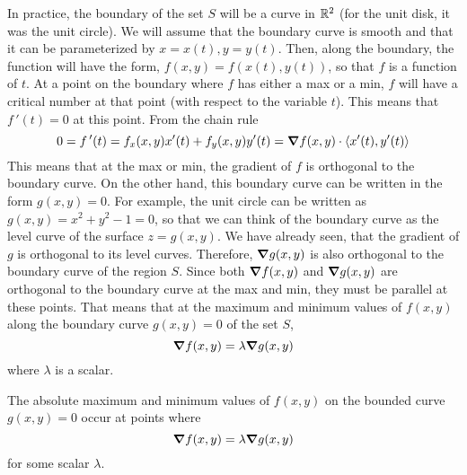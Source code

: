 \documentclass[handout]{ximera}
\begin{document}
In practice, the boundary of the set $S$ will be a curve in $\mathbb R^2$ (for the unit disk, it was the unit circle).
We will assume that the boundary curve is smooth and that it can be parameterized by $x = x(t), y = y(t)$.
Then, along the boundary, the function will have the form, $f(x, y) = f(x(t), y(t))$, so that $f$ is a function of $t$.
At a point on the boundary where $f$ has either a max or a min, $f$ will have a critical number at that point (with respect to the variable $t$).
This means that $f\,'(t) = 0$ at this point. From the chain rule
\[
0 = f\,'(t) = f_x(x, y) x'(t) + f_y(x,y) y'(t) = \boldsymbol\nabla f(x,y) \cdot \left\langle x'(t), y'(t)\right\rangle
\]
This means that at the max or min, the gradient of $f$ is orthogonal to the boundary curve.
On the other hand, this boundary curve can be written in the form $g(x,y) = 0$. For example, the unit circle can be written as $g(x,y) = x^2 + y^2 - 1 = 0$,
so that we can think of the boundary curve as the level curve of the surface $z = g(x,y)$. We have already seen, that the gradient of $g$ is orthogonal
to its level curves.  Therefore, $\boldsymbol\nabla g(x,y)$ is also orthogonal to the boundary curve of the region $S$.
Since both $\boldsymbol\nabla f(x,y)$ and $\boldsymbol\nabla g(x,y)$ are orthogonal to the boundary curve at the max and min, they must be parallel at these points.
That means that at the maximum and minimum values of $f(x,y)$ along the boundary curve $g(x,y) = 0$ of the set $S$, 
\[
\boldsymbol\nabla f(x,y) = \lambda \boldsymbol\nabla g(x,y)
\]
where $\lambda$ is a scalar.

\begin{theorem}
The absolute maximum and minimum values of $f(x,y)$ on the bounded curve $g(x,y) = 0$ occur at 
points where 
\[
\boldsymbol\nabla f(x,y) = \lambda \boldsymbol\nabla g(x,y)
\]
for some scalar $\lambda$.
\end{theorem}
\end{document}
